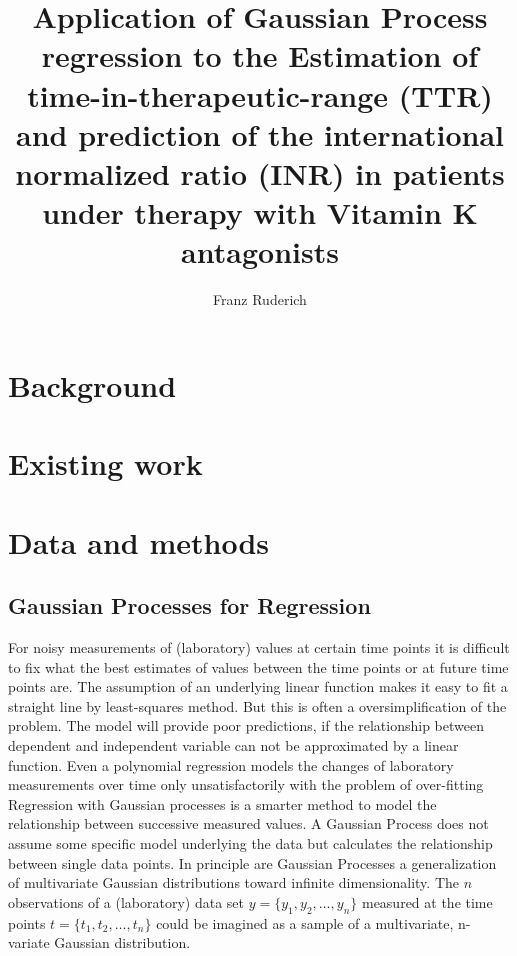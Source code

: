 \documentclass[12pt]{article}
\title{Application of Gaussian Process regression to the Estimation of time-in-therapeutic-range (TTR) and prediction of the international normalized ratio (INR) in patients under therapy with Vitamin K antagonists}
\author{Franz Ruderich}
\begin{document}
	\maketitle
	
	\clearpage
	\listoftodos
	
	\vspace{2\baselineskip}

	
	\clearpage
	
	\section{Background}
	
	\section{Existing work}
	
	\section{Data and methods}
	
	\subsection{Gaussian Processes for Regression}
	For noisy measurements of (laboratory) values at certain time points it is difficult to fix
	what the best estimates of values between the time points or at future time points are.
	The assumption of an underlying linear function makes it easy to fit a straight line by least-squares method. But this is often a oversimplification of the problem. The model will provide poor predictions, if the relationship between  dependent and independent variable can not be approximated by a linear function.
	Even a polynomial regression models the changes of laboratory measurements  over time only unsatisfactorily with the problem of over-fitting
	Regression with Gaussian processes is a smarter method to model the relationship between successive measured values. 
	A Gaussian Process does not assume some specific model underlying the data but calculates the relationship between single data points.
	In principle are Gaussian Processes a generalization of multivariate Gaussian distributions toward infinite dimensionality.
	The $n$ observations of a (laboratory) data set $y=\{y_{1},y_{2}, \ldots ,y_{n}\}$ measured at the time points $t=\{t_{1},t_{2}, \ldots ,t_{n}\}$ could be imagined as a sample of a multivariate, n-variate Gaussian distribution.
	
\end{document}
